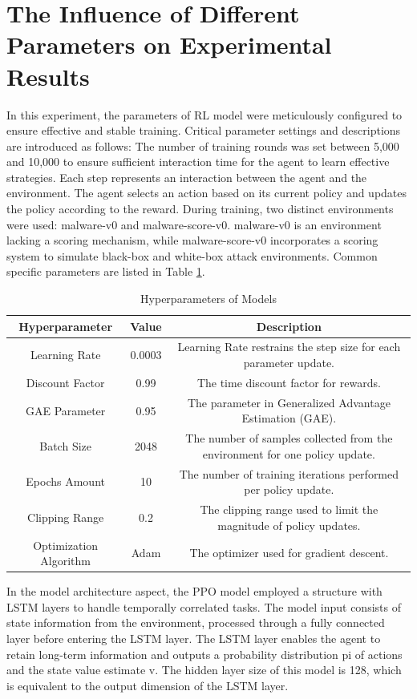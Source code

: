 \section{The Influence of Different Parameters on Experimental Results}

In this experiment, the parameters of RL model were meticulously configured to ensure effective and stable training. Critical parameter settings and descriptions are introduced as follows: The number of training rounds was set between 5,000 and 10,000 to ensure sufficient interaction time for the agent to learn effective strategies. Each step represents an interaction between the agent and the environment. The agent selects an action based on its current policy and updates the policy according to the reward. During training, two distinct environments were used: malware-v0 and malware-score-v0. malware-v0 is an environment lacking a scoring mechanism, while malware-score-v0 incorporates a scoring system to simulate black-box and white-box attack environments. Common specific parameters are listed in Table \ref{tab:5.5}.

\begin{table}[htbp]
	\centering
	\caption{Hyperparameters of Models}
	\label{tab:5.5}
    \begin{tabular*}{0.9\textwidth}{@{\extracolsep{\fill}}ccc}
    \toprule
		Hyperparameter & Value & Description \\
    \midrule
		Learning Rate & 0.0003 & Learning Rate restrains the step size for each parameter update. \\
		Discount Factor & 0.99 & The time discount factor for rewards. \\
		GAE Parameter & 0.95 & The parameter in Generalized Advantage Estimation (GAE). \\
		Batch Size & 2048 & The number of samples collected from the environment for one policy update. \\
		Epochs Amount & 10 & The number of training iterations performed per policy update. \\
		Clipping Range & 0.2 & The clipping range used to limit the magnitude of policy updates.\\
		Optimization Algorithm & Adam & The optimizer used for gradient descent. \\
    \bottomrule
	\end{tabular*}
\end{table}

In the model architecture aspect, the PPO model employed a structure with LSTM layers to handle temporally correlated tasks. The model input consists of state information from the environment, processed through a fully connected layer before entering the LSTM layer. The LSTM layer enables the agent to retain long-term information and outputs a probability distribution pi of actions and the state value estimate v. The hidden layer size of this model is 128, which is equivalent to the output dimension of the LSTM layer.

